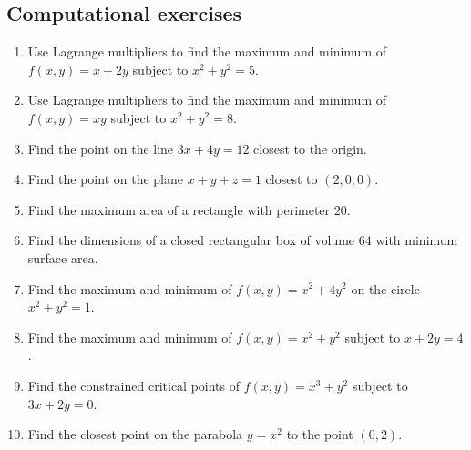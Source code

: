 \documentclass[11pt]{article}
\begin{document}
\subsection*{Computational exercises}
\begin{enumerate}[start=6]
  \item Use Lagrange multipliers to find the maximum and minimum of $f(x,y)=x+2y$ subject to $x^2+y^2=5$.
  \item Use Lagrange multipliers to find the maximum and minimum of $f(x,y)=xy$ subject to $x^2+y^2=8$.
  \item Find the point on the line $3x+4y=12$ closest to the origin.
  \item Find the point on the plane $x+y+z=1$ closest to $(2,0,0)$.
  \item Find the maximum area of a rectangle with perimeter $20$.
  \item Find the dimensions of a closed rectangular box of volume $64$ with minimum surface area.
  \item Find the maximum and minimum of $f(x,y)=x^2+4y^2$ on the circle $x^2+y^2=1$.
  \item Find the maximum and minimum of $f(x,y)=x^2+y^2$ subject to $x+2y=4$.
  \item Find the constrained critical points of $f(x,y)=x^3+y^2$ subject to $3x+2y=0$.
  \item Find the closest point on the parabola $y=x^2$ to the point $(0,2)$.
\end{enumerate}
\end{document}
